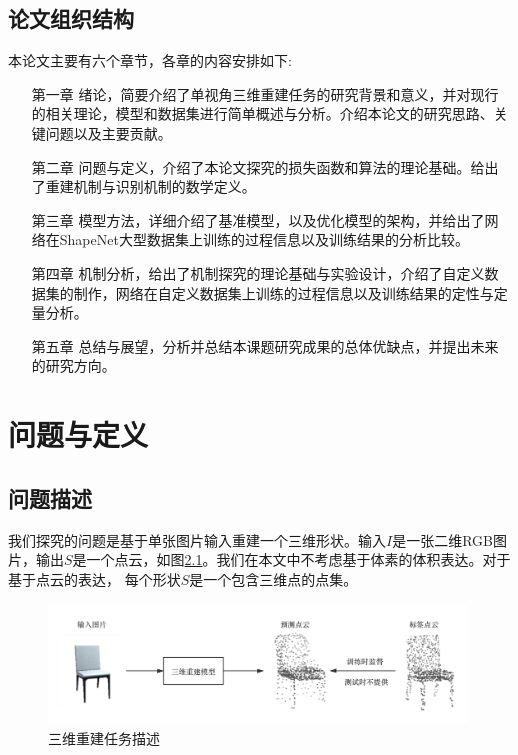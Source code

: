 \documentclass[bachelor, nocolorlinks, printoneside]{seuthesis} %
\begin{document}
\begin{Main}
\section{论文组织结构}
本论文主要有六个章节，各章的内容安排如下:
\begin{itemize}[\hspace{2cm}]
    \item[第一章] 绪论，简要介绍了单视角三维重建任务的研究背景和意义，并对现行的相关理论，模型和数据集进行简单概述与分析。介绍本论文的研究思路、关键问题以及主要贡献。
    \item[第二章] 问题与定义，介绍了本论文探究的损失函数和算法的理论基础。给出了重建机制与识别机制的数学定义。
    \item[第三章] 模型方法，详细介绍了基准模型，以及优化模型的架构，并给出了网络在ShapeNet大型数据集上训练的过程信息以及训练结果的分析比较。
    \item[第四章] 机制分析，给出了机制探究的理论基础与实验设计，介绍了自定义数据集的制作，网络在自定义数据集上训练的过程信息以及训练结果的定性与定量分析。
    \item[第五章] 总结与展望，分析并总结本课题研究成果的总体优缺点，并提出未来的研究方向。
\end{itemize}


\chapter{问题与定义}
\section{问题描述}
我们探究的问题是基于单张图片输入重建一个三维形状。输入$I$是一张二维RGB图片，输出$S$是一个点云，如图\ref{fig:pro_state}。我们在本文中不考虑基于体素的体积表达。对于基于点云的表达，
每个形状$S$是一个包含三维点的点集。

\begin{figure}
    \centering
    \includegraphics[width=0.99\textwidth]{figs/pro_state_demo/problem_statement_demo.png} 
    \caption{三维重建任务描述}
    \label{fig:pro_state}
\end{figure}


\end{Main}
\end{document}
